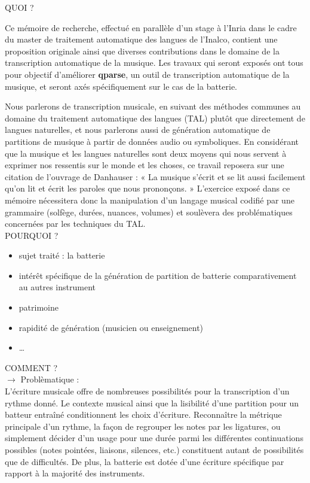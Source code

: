 QUOI ?

Ce mémoire de recherche, effectué en parallèle d’un stage à l’Inria dans le
cadre du master de traitement automatique des langues de l’Inalco, contient
une proposition originale ainsi que diverses contributions dans le domaine de
la transcription automatique de la musique. Les travaux qui seront exposés ont
tous pour objectif d’améliorer \textbf{qparse}, un outil de transcription
automatique de la musique, et seront axés spécifiquement sur le cas de la
batterie.

Nous parlerons de transcription musicale, en suivant des méthodes communes au
domaine du traitement automatique des langues (TAL) plutôt que directement de
langues naturelles, et nous parlerons aussi de génération automatique de
partitions de musique à partir de données audio ou symboliques. En considérant
que la musique et les langues naturelles sont deux moyens qui nous servent à
exprimer nos ressentis sur le monde et les choses, ce travail reposera sur une
citation de l’ouvrage de Danhauser \cite{danhauser} : « La musique s’écrit et
se lit aussi facilement qu’on lit et écrit les paroles que nous prononçons. »
L’exercice exposé dans ce mémoire nécessitera donc la manipulation d’un langage
musical codifié par une grammaire (solfège, durées, nuances, volumes) et
soulèvera des problématiques concernées par les techniques du TAL.\\

POURQUOI ?
\begin{itemize}
	\item sujet traité : la batterie
	\item intérêt spécifique de la génération de partition de batterie comparativement
  au autres instrument
	\item patrimoine
	\item rapidité de génération (musicien ou enseignement)
	\item …\\
\end{itemize}



COMMENT ?\\
$\to$ Problèmatique :\\
L’écriture musicale offre de nombreuses possibilités pour la transcription d’un
rythme donné. Le contexte musical ainsi que la lisibilité d’une partition pour
un batteur entraîné conditionnent les choix d’écriture. Reconnaître la
métrique principale d’un rythme, la façon de regrouper les notes par les
ligatures, ou simplement décider d’un usage pour une durée parmi les
différentes continuations possibles (notes pointées, liaisons, silences, etc.)
constituent autant de possibilités que de difficultés. De plus, la batterie
est dotée d’une écriture spécifique par rapport à la majorité des
instruments.\\

